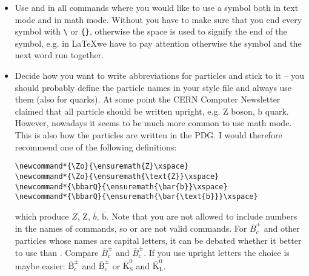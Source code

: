 \begin{itemize}
  because the
  \texttt{\{obeyall\}}\footnote{
    in .} option is set in \texttt{ubonn-thesis.sty}
  (see Section~\ref{sec:tips:siunitx}).  I used the option
  \footnote{ in } for the  command in the 2nd expression.
  In the first expression I use  for \enquote{jet}, while
  I use  in the second expression.
\item Use  and
   in all commands where you would
  like to use a symbol both in text mode and in math mode. Without
   you have to make sure that you end every symbol with
  \texttt{\textbackslash} or \texttt{\{\}}, otherwise the space is used
  to signify the end of the symbol, e.g. in \LaTeX we have to pay
  attention otherwise the symbol and the next word run together.
\item Decide how you want to write abbreviations for particles and
  stick to it -- you should probably define the particle names in your
  style file and always use them (also for quarks). At some point the
  CERN Computer Newsletter claimed that all particle should be written
  upright, e.g. $\text{Z}$ boson, $\text{b}$ quark. However, nowadays
  it seems to be much more common to use math mode. This is also how
  the particles are written in the PDG. I would therefore
  recommend one of the following definitions:
\begin{verbatim}
\newcommand*{\Zo}{\ensuremath{Z}\xspace}
\newcommand*{\Zo}{\ensuremath{\text{Z}}\xspace}
\newcommand*{\bbarQ}{\ensuremath{\bar{b}}\xspace}
\newcommand*{\bbarQ}{\ensuremath{\bar{\text{b}}}\xspace}
\end{verbatim}
  which produce \ensuremath{Z}, \ensuremath{\text{Z}},
  \ensuremath{\bar{b}}, \ensuremath{\bar{\text{b}}}. Note that you are
  not allowed to include numbers in the names of commands, so
   or  are not valid commands. For
  $\overline{B}^{\pm}_{c}$ and other particles whose names are capital
  letters, it can be debated whether it better to use
   than
  . Compare $\overline{B}^{\pm}_{c}$ and
  $\bar{B}^{\pm}_{c}$. If you use upright letters the choice is maybe
  easier: $\overline{\text{B}}^{\pm}_{\text{c}}$ and
  $\bar{\text{B}}^{\pm}_{\text{c}}$ or
  $\overline{\text{K}}^{0}_{\text{S}}$ and
  $\bar{\text{K}}^{0}_{\text{L}}$.


\end{itemize}

